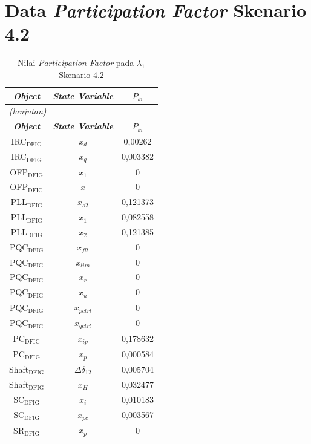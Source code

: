 \section{Data \textit{Participation Factor} Skenario 4.2}
\begingroup
\fontsize{12}{14.4}\selectfont
\setlength{\tabcolsep}{8pt}
\begin{longtable}{c c c} \caption[]{Nilai
	\textit{Participation Factor} pada $\lambda_1$ Skenario 4.2}
	\label{tab:prf_sk42_lampiran} \\
	\toprule
	\multicolumn{1}{c}{\textbf{\textit{Object}}} & \textbf{\textit{State
	Variable}} & \textbf{$P_{ki}$} \\
	\midrule
	\endfirsthead
	\multicolumn{3}{l}{\textit{(lanjutan)}} \\
	\toprule
	\multicolumn{1}{c}{\textbf{\textit{Object}}} & \textbf{\textit{State
	Variable}} & \textbf{$P_{ki}$} \\
	\midrule
	\endhead
	\bottomrule
	\endfoot
	IRC$_\text{DFIG}$ & $x_d$ & 0,00262   \\
	IRC$_\text{DFIG}$ & $x_q$ & 0,003382  \\
	OFP$_\text{DFIG}$ & $x_1$ & 0         \\
	OFP$_\text{DFIG}$ & $x$ & 0         \\
	PLL$_\text{DFIG}$ & $x_{s2}$ & 0,121373  \\
	PLL$_\text{DFIG}$ & $x_1$ & 0,082558  \\
	PLL$_\text{DFIG}$ & $x_2$ & 0,121385  \\
	PQC$_\text{DFIG}$ & $x_{flt}$ & 0         \\
	PQC$_\text{DFIG}$ & $x_{lim}$ & 0         \\
	PQC$_\text{DFIG}$ & $x_r$ & 0         \\
	PQC$_\text{DFIG}$ & $x_u$ & 0         \\
	PQC$_\text{DFIG}$ & $x_{pctrl}$ & 0         \\
	PQC$_\text{DFIG}$ & $x_{qctrl}$ & 0         \\
	PC$_\text{DFIG}$ & $x_{ip}$ & 0,178632  \\
	PC$_\text{DFIG}$ & $x_p$ & 0,000584  \\
	Shaft$_\text{DFIG}$ & $\Delta\delta_{12}$ & 0,005704  \\
	Shaft$_\text{DFIG}$ & $x_H$ & 0,032477  \\
	SC$_\text{DFIG}$ & $x_i$ & 0,010183  \\
	SC$_\text{DFIG}$ & $x_{pc}$ & 0,003567  \\
	SR$_\text{DFIG}$ & $x_p$ & 0         \\

\end{longtable}
